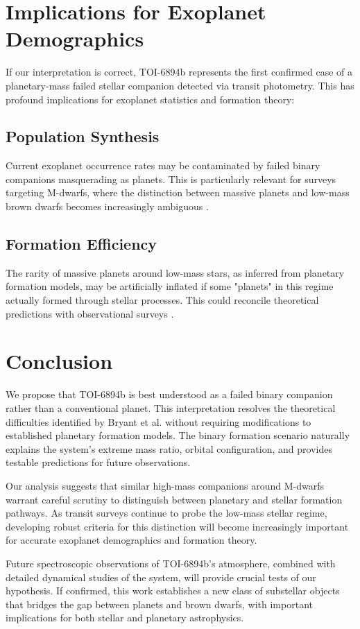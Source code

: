 \documentclass[12pt]{article}
\begin{document}
\section{Implications for Exoplanet Demographics}

If our interpretation is correct, TOI-6894b represents the first confirmed case of a planetary-mass failed stellar companion detected via transit photometry. This has profound implications for exoplanet statistics and formation theory:

\subsection{Population Synthesis}

Current exoplanet occurrence rates may be contaminated by failed binary companions masquerading as planets. This is particularly relevant for surveys targeting M-dwarfs, where the distinction between massive planets and low-mass brown dwarfs becomes increasingly ambiguous \citep{grether2006relationship}.

\subsection{Formation Efficiency}

The rarity of massive planets around low-mass stars, as inferred from planetary formation models, may be artificially inflated if some "planets" in this regime actually formed through stellar processes. This could reconcile theoretical predictions with observational surveys \citep{dressing2013occurrence}.

\section{Conclusion}

We propose that TOI-6894b is best understood as a failed binary companion rather than a conventional planet. This interpretation resolves the theoretical difficulties identified by Bryant et al. without requiring modifications to established planetary formation models. The binary formation scenario naturally explains the system's extreme mass ratio, orbital configuration, and provides testable predictions for future observations.

Our analysis suggests that similar high-mass companions around M-dwarfs warrant careful scrutiny to distinguish between planetary and stellar formation pathways. As transit surveys continue to probe the low-mass stellar regime, developing robust criteria for this distinction will become increasingly important for accurate exoplanet demographics and formation theory.

Future spectroscopic observations of TOI-6894b's atmosphere, combined with detailed dynamical studies of the system, will provide crucial tests of our hypothesis. If confirmed, this work establishes a new class of substellar objects that bridges the gap between planets and brown dwarfs, with important implications for both stellar and planetary astrophysics.



\end{document}
